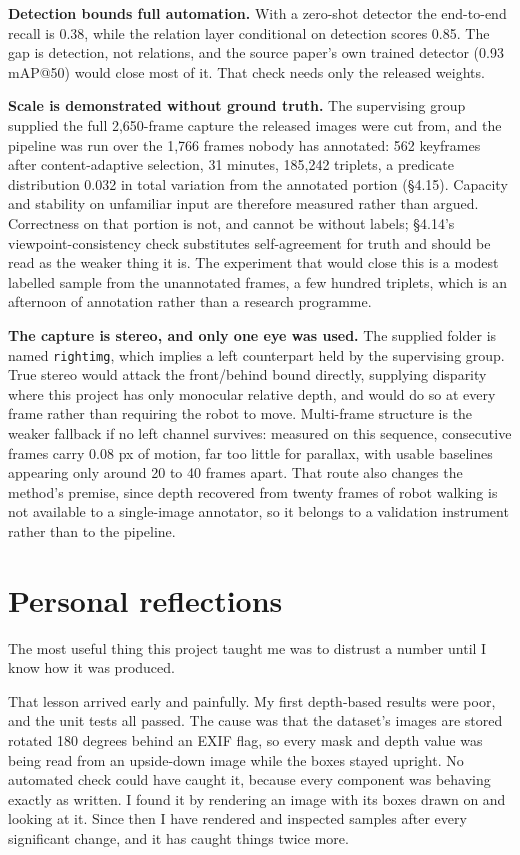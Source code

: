 \textbf{Detection bounds full automation.} With a zero-shot detector the end-to-end recall is 0.38, while the relation layer conditional on detection scores 0.85. The gap is detection, not relations, and the source paper's own trained detector (0.93 mAP@50) would close most of it. That check needs only the released weights.

\textbf{Scale is demonstrated without ground truth.} The supervising group supplied the full 2,650-frame capture the released images were cut from, and the pipeline was run over the 1,766 frames nobody has annotated: 562 keyframes after content-adaptive selection, 31 minutes, 185,242 triplets, a predicate distribution 0.032 in total variation from the annotated portion (\S4.15). Capacity and stability on unfamiliar input are therefore measured rather than argued. Correctness on that portion is not, and cannot be without labels; \S4.14's viewpoint-consistency check substitutes self-agreement for truth and should be read as the weaker thing it is. The experiment that would close this is a modest labelled sample from the unannotated frames, a few hundred triplets, which is an afternoon of annotation rather than a research programme.

\textbf{The capture is stereo, and only one eye was used.} The supplied folder is named \texttt{rightimg}, which implies a left counterpart held by the supervising group. True stereo would attack the front/behind bound directly, supplying disparity where this project has only monocular relative depth, and would do so at every frame rather than requiring the robot to move. Multi-frame structure is the weaker fallback if no left channel survives: measured on this sequence, consecutive frames carry 0.08 px of motion, far too little for parallax, with usable baselines appearing only around 20 to 40 frames apart. That route also changes the method's premise, since depth recovered from twenty frames of robot walking is not available to a single-image annotator, so it belongs to a validation instrument rather than to the pipeline.

\section{Personal reflections}

The most useful thing this project taught me was to distrust a number until I know how it was produced.

That lesson arrived early and painfully. My first depth-based results were poor, and the unit tests all passed. The cause was that the dataset's images are stored rotated 180 degrees behind an EXIF flag, so every mask and depth value was being read from an upside-down image while the boxes stayed upright. No automated check could have caught it, because every component was behaving exactly as written. I found it by rendering an image with its boxes drawn on and looking at it. Since then I have rendered and inspected samples after every significant change, and it has caught things twice more.

